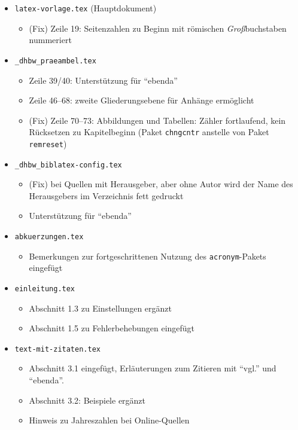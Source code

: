 \begin{itemize}
\item \verb|latex-vorlage.tex| (Hauptdokument)
\begin{itemize}
\item (Fix) Zeile 19: Seitenzahlen zu Beginn mit römischen \emph{Groß}buchstaben nummeriert
\end{itemize}

\item \verb|_dhbw_praeambel.tex|
\begin{itemize}
\item Zeile 39/40: Unterstützung für \enquote{ebenda} 
\item Zeile 46--68: zweite Gliederungsebene für Anhänge ermöglicht
\item (Fix) Zeile 70--73: Abbildungen und Tabellen: Zähler fortlaufend, kein Rücksetzen zu Kapitelbeginn (Paket \verb|chngcntr| anstelle von Paket \verb|remreset|)
\end{itemize}

\item \verb|_dhbw_biblatex-config.tex|
\begin{itemize}
\item (Fix) bei Quellen mit Herausgeber, aber ohne Autor wird der Name des Herausgebers im Verzeichnis fett gedruckt
\item Unterstützung für \enquote{ebenda} 
\end{itemize}

\item \verb|abkuerzungen.tex|
\begin{itemize}
\item Bemerkungen zur fortgeschrittenen Nutzung des \verb|acronym|-Pakets eingefügt 
\end{itemize}

\item \verb|einleitung.tex|
\begin{itemize}
\item Abschnitt 1.3 zu Einstellungen ergänzt
\item Abschnitt 1.5 zu Fehlerbehebungen eingefügt 
\end{itemize}

\item \verb|text-mit-zitaten.tex|
\begin{itemize}
\item Abschnitt 3.1 eingefügt, Erläuterungen zum Zitieren mit \enquote{vgl.} und \enquote{ebenda}. 
\item Abschnitt 3.2: Beispiele ergänzt
\item Hinweis zu Jahreszahlen bei Online-Quellen
\end{itemize}


\end{itemize}
